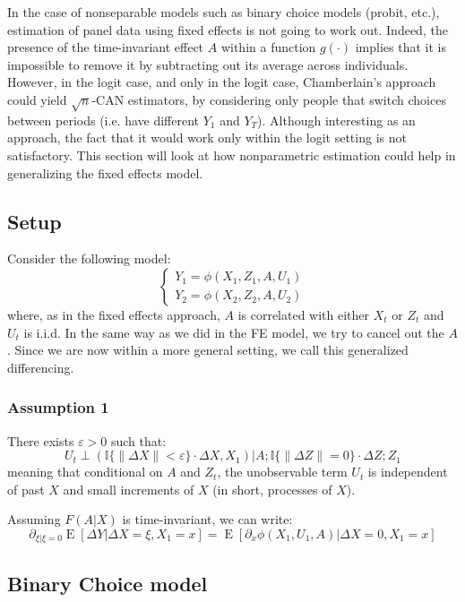 \documentclass[12pt]{report}
\newcommand{\E}[1]{\operatorname{E}\left[#1\right]}
\begin{document}
In the case of nonseparable models such as binary choice models (probit, etc.), estimation of panel data using fixed effects is not going to work out. Indeed, the presence of the time-invariant effect $A$ within a function $g(\cdot)$ implies that it is impossible to remove it by subtracting out its average across individuals. However, in the logit case, and only in the logit case, Chamberlain's approach could yield $\sqrt{n}$-CAN estimators, by considering only people that switch choices between periods (i.e. have different $Y_1$ and $Y_T$). Although interesting as an approach, the fact that it would work only within the logit setting is not satisfactory. This section will look at how nonparametric estimation could help in generalizing the fixed effects model.

\subsection{Setup}

Consider the following model: $$\begin{cases}
Y_1 = \phi(X_1, Z_1, A, U_1) \\
Y_2 = \phi(X_2, Z_2, A, U_2)
\end{cases} $$ where, as in the fixed effects approach, $A$ is correlated with either $X_t$ or $Z_t$ and $U_t$ is i.i.d. In the same way as we did in the FE model, we try to cancel out the $A$. Since we are now within a more general setting, we call this generalized differencing. 

\subsubsection{Assumption 1}

There exists $\varepsilon > 0$ such that: $$U_t\perp (\mathbb{I}\{\lVert\Delta X\rVert <\varepsilon \}\cdot\Delta X, X_1)\vert A ; \mathbb{I}\{\lVert\Delta Z\rVert = 0 \}\cdot\Delta Z; Z_1$$ meaning that conditional on $A$ and $Z_t$, the unobservable term $U_t$ is independent of past $X$ and small increments of $X$ (in short, processes of $X$).

Assuming $F(A\vert X)$ is time-invariant, we can write: $$\partial_{\xi\vert\xi=0}\E{\Delta Y\vert \Delta X = \xi, X_1 = x} = \E{\partial_x\phi(X_1, U_1, A) \vert \Delta X = 0, X_1 = x} $$

\subsection{Binary Choice model}
\end{document}

